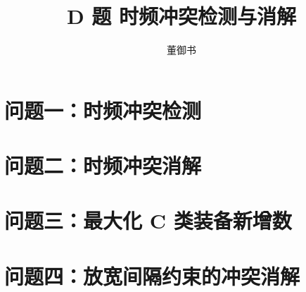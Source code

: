 \documentclass[bwprint,twoside]{gmcmthesis}
\title{D 题 时频冲突检测与消解}
\author{董御书}
\numberwithin{figure}{section}
\begin{document}
\maketitle

\newpage
\tableofcontents
\newpage

\section{问题一：时频冲突检测}


\section{问题二：时频冲突消解}


\section{问题三：最大化 C 类装备新增数}


\section{问题四：放宽间隔约束的冲突消解}

\end{document}
